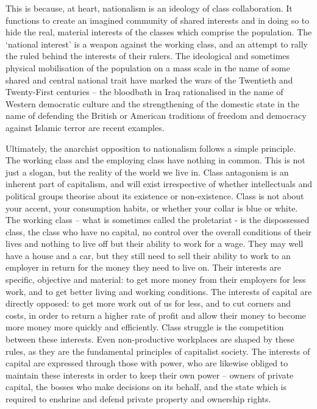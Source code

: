 This is because, at heart, nationalism is an ideology of class collaboration.
It functions to create an imagined community of shared interests and in doing so to hide the real, material interests of the classes which comprise the population.
The ‘national interest’ is a weapon against the working class, and an attempt to rally the ruled behind the interests of their rulers.
The ideological and sometimes physical mobilisation of the population on a mass scale in the name of some shared and central national trait have marked the wars of the Twentieth and Twenty-First centuries – the bloodbath in Iraq rationalised in the name of Western democratic culture and the strengthening of the domestic state in the name of defending the British or American traditions of freedom and democracy against Islamic terror are recent examples.

Ultimately, the anarchist opposition to nationalism follows a simple principle.
The working class and the employing class have nothing in common.
This is not just a slogan, but the reality of the world we live in.
Class antagonism is an inherent part of capitalism, and will exist irrespective of whether intellectuals and political groups theorise about its existence or non-existence.
Class is not about your accent, your consumption habits, or whether your collar is blue or white.
The working class – what is sometimes called the proletariat - is the dispossessed class, the class who have no capital, no control over the overall conditions of their lives and nothing to live off but their ability to work for a wage.
They may well have a house and a car, but they still need to sell their ability to work to an employer in return for the money they need to live on.
Their interests are specific, objective and material: to get more money from their employers for less work, and to get better living and working conditions.
The interests of capital are directly opposed: to get more work out of us for less, and to cut corners and costs, in order to return a higher rate of profit and allow their money to become more money more quickly and efficiently.
Class struggle is the competition between these interests.
Even non-productive workplaces are shaped by these rules, as they are the fundamental principles of capitalist society.
The interests of capital are expressed through those with power, who are likewise obliged to maintain these interests in order to keep their own power – owners of private capital, the bosses who make decisions on its behalf, and the state which is required to enshrine and defend private property and ownership rights.

